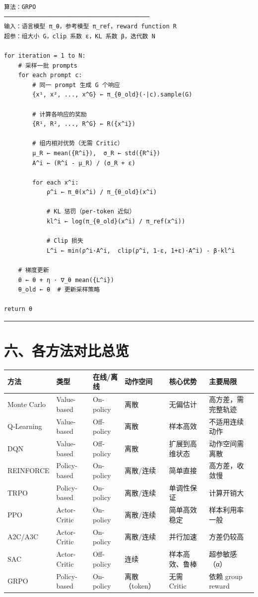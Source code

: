 \begin{verbatim}
算法：GRPO
─────────────────────────────────────────
输入：语言模型 π_θ，参考模型 π_ref，reward function R
超参：组大小 G，clip 系数 ε，KL 系数 β，迭代数 N

for iteration = 1 to N:
    # 采样一批 prompts
    for each prompt c:
        # 同一 prompt 生成 G 个响应
        {x¹, x², ..., x^G} ← π_{θ_old}(·|c).sample(G)
        
        # 计算各响应的奖励
        {R¹, R², ..., R^G} ← R({x^i})
        
        # 组内相对优势（无需 Critic）
        μ_R ← mean({R^i}),  σ_R ← std({R^i})
        A^i ← (R^i - μ_R) / (σ_R + ε)
        
        for each x^i:
            ρ^i ← π_θ(x^i) / π_{θ_old}(x^i)
            
            # KL 惩罚（per-token 近似）
            kl^i ← log(π_{θ_old}(x^i) / π_ref(x^i))
            
            # Clip 损失
            L^i ← min(ρ^i·A^i,  clip(ρ^i, 1-ε, 1+ε)·A^i) - β·kl^i
    
    # 梯度更新
    θ ← θ + η · ∇_θ mean({L^i})
    θ_old ← θ  # 更新采样策略

return θ
\end{verbatim}

\hrule

\section{六、各方法对比总览}

\begin{center}
\begin{tabular}{llllll}
\toprule
方法 & 类型 & 在线/离线 & 动作空间 & 核心优势 & 主要局限 \\
\midrule
Monte Carlo & Value-based & On-policy & 离散 & 无偏估计 & 高方差，需完整轨迹 \\
Q-Learning & Value-based & Off-policy & 离散 & 样本高效 & 不适用连续动作 \\
DQN & Value-based & Off-policy & 离散 & 扩展到高维状态 & 动作空间需离散 \\
REINFORCE & Policy-based & On-policy & 离散/连续 & 简单直接 & 高方差，收敛慢 \\
TRPO & Policy-based & On-policy & 离散/连续 & 单调性保证 & 计算开销大 \\
PPO & Actor-Critic & On-policy & 离散/连续 & 简单高效稳定 & 样本利用率一般 \\
A2C/A3C & Actor-Critic & On-policy & 离散/连续 & 并行加速 & 方差仍较高 \\
SAC & Actor-Critic & Off-policy & 连续 & 样本高效、鲁棒 & 超参敏感（α） \\
GRPO & Policy-based & On-policy & 离散（token） & 无需 Critic & 依赖 group reward \\
\bottomrule
\end{tabular}
\end{center}

